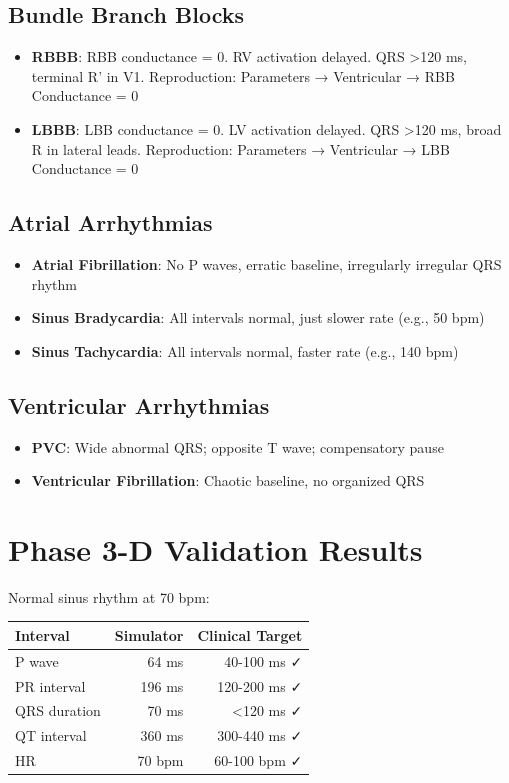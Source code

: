 \documentclass[12pt,a4paper]{article}
\begin{document}
\subsection*{Bundle Branch Blocks}

\begin{itemize}
\item \textbf{RBBB}: RBB conductance = 0. RV activation delayed. 
  QRS >120 ms, terminal R' in V1.
  Reproduction: Parameters → Ventricular → RBB Conductance = 0

\item \textbf{LBBB}: LBB conductance = 0. LV activation delayed.
  QRS >120 ms, broad R in lateral leads.
  Reproduction: Parameters → Ventricular → LBB Conductance = 0

\end{itemize}

\subsection*{Atrial Arrhythmias}

\begin{itemize}
\item \textbf{Atrial Fibrillation}: No P waves, erratic baseline, irregularly irregular QRS rhythm
\item \textbf{Sinus Bradycardia}: All intervals normal, just slower rate (e.g., 50 bpm)
\item \textbf{Sinus Tachycardia}: All intervals normal, faster rate (e.g., 140 bpm)
\end{itemize}

\subsection*{Ventricular Arrhythmias}

\begin{itemize}
\item \textbf{PVC}: Wide abnormal QRS; opposite T wave; compensatory pause
\item \textbf{Ventricular Fibrillation}: Chaotic baseline, no organized QRS
\end{itemize}

\section*{Phase 3-D Validation Results}

Normal sinus rhythm at 70 bpm:

\begin{tabular}{|l|r|r|}
\hline
Interval & Simulator & Clinical Target \\
\hline
P wave & 64 ms & 40-100 ms ✓ \\
PR interval & 196 ms & 120-200 ms ✓ \\
QRS duration & 70 ms & <120 ms ✓ \\
QT interval & 360 ms & 300-440 ms ✓ \\
HR & 70 bpm & 60-100 bpm ✓ \\
\hline
\end{tabular}
\end{document}
